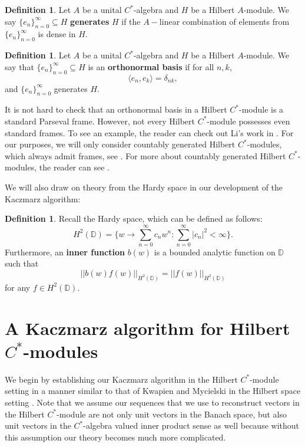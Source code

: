 \documentclass[11pt]{amsart}
\theoremstyle{definition}
\newtheorem{defn}[thm]{Definition}
\numberwithin{equation}{section}
\begin{document}
\begin{defn}
Let $A$ be a unital $C^{*}$-algebra and $H$ be a Hilbert $A$-module. We say $\{e_{n}\}_{n=0}^{\infty}\subseteq H$ \textbf{generates} $H$ if the $A-$linear combination of elements from $\{e_{n}\}_{n=0}^{\infty}$ is dense in $H$.
\end{defn}

\begin{defn}
Let $A$ be a unital $C^{*}$-algebra and $H$ be a Hilbert $A$-module. We say that $\{e_{n}\}_{n=0}^{\infty}\subseteq H$ is an \textbf{orthonormal basis} if for all $n, k$,
$$\langle e_{n},e_{k}\rangle=\delta_{nk},$$ and $\{e_{n}\}_{n=0}^{\infty}$ generates $H$.
\end{defn}

It is not hard to check that an orthonormal basis in a Hilbert $C^{*}$-module is a standard Parseval frame. However, not every Hilbert $C^{*}$-module possesses even standard frames. To see an example, the reader can check out Li's work in \cite{Li2010Hilbert}. For our purposes, we will only consider countably generated Hilbert $C^{*}$-modules, which always admit frames, see \cite{Frank2002Frames}. For more about countably generated Hilbert $C^{*}$-modules, the reader can see \cite{Raeburn2003Countably}.

We will also draw on theory from the Hardy space in our development of the Kaczmarz algorithm:
\begin{defn}
Recall the Hardy space, which can be defined as follows:
$$H^{2}(\mathbb{D})=\{w\to \sum_{n=0}^{\infty}c_{n}w^{n}: \sum_{n=0}^{\infty}|c_{n}|^{2}<\infty\}.$$
Furthermore, an \textbf{inner function} $b(w)$ is a bounded analytic function on $\mathbb{D}$ such that 
$$||b(w)f(w)||_{H^{2}(\mathbb{D})}=||f(w)||_{H^{2}(\mathbb{D})}$$ for any $f\in H^{2}(\mathbb{D})$.
\end{defn}

\section{A Kaczmarz algorithm for Hilbert $C^{*}$-modules}\label{S3}
We begin by establishing our Kaczmarz algorithm in the Hilbert $C^{*}$-module setting in a manner similar to that of Kwapien and Mycielski in the Hilbert space setting \cite{Kwapien2001Kaczmarz}. Note that we assume our sequences that we use to reconstruct vectors in the Hilbert $C^{*}$-module are not only unit vectors in the Banach space, but also unit vectors in the $C^{*}$-algebra valued inner product sense as well because without this assumption our theory becomes much more complicated.
\end{document}
